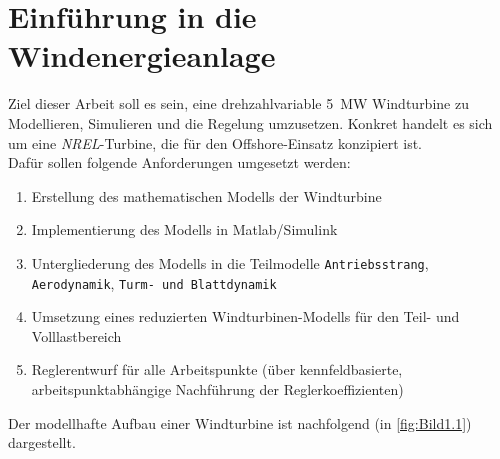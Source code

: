 \section{Einführung in die Windenergieanlage} \label{einfuehrung}

Ziel dieser Arbeit soll es sein, eine drehzahlvariable \SI{5}{MW} Windturbine zu Modellieren, Simulieren und die Regelung umzusetzen. Konkret handelt es sich um eine \textit{NREL}-Turbine, die für den Offshore-Einsatz konzipiert ist.\\
Dafür sollen folgende Anforderungen umgesetzt werden:

\begin{enumerate}
    \item Erstellung des mathematischen Modells der Windturbine
    \item Implementierung des Modells in Matlab/Simulink
    \item Untergliederung des Modells in die Teilmodelle \texttt{Antriebsstrang}, \texttt{Aerodynamik}, \texttt{Turm- und Blattdynamik}
    \item Umsetzung eines reduzierten Windturbinen-Modells für den Teil- und Volllastbereich
    \item Reglerentwurf für alle Arbeitspunkte (über kennfeldbasierte, arbeitspunktabhängige Nachführung der Reglerkoeffizienten)
\end{enumerate}

Der modellhafte Aufbau einer Windturbine ist nachfolgend (in \autoref{fig:Bild1.1}) dargestellt.

